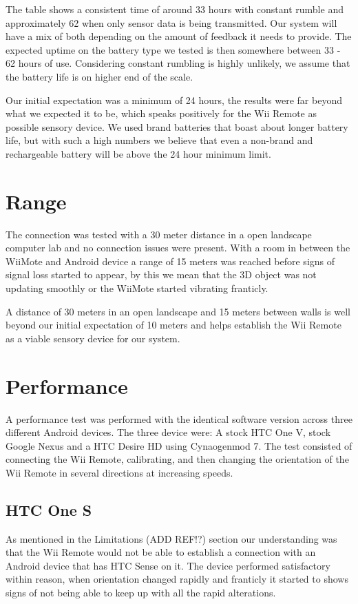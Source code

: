 The table shows a consistent time of around 33 hours with constant rumble and approximately 62 when only sensor data is being transmitted. Our system will have a mix of both depending on the amount of feedback it needs to provide. The expected uptime on the battery type we tested is then somewhere between 33 - 62 hours of use. Considering constant rumbling is highly unlikely, we assume that the battery life is on higher end of the scale.

Our initial expectation was a minimum of 24 hours, the results were far beyond what we expected it to be, which speaks positively for the Wii Remote as possible sensory device. We used brand batteries that boast about longer battery life, but with such a high numbers we believe that even a non-brand and rechargeable battery will be above the 24 hour minimum limit.
\section{Range}
The connection was tested with a 30 meter distance in a open landscape computer lab and no connection issues were present. With a room in between the WiiMote and Android device a range of 15 meters was reached before signs of signal loss started to appear, by this we mean that the 3D object was not updating smoothly or the WiiMote started vibrating franticly.

A distance of 30 meters in an open landscape and 15 meters between walls is well beyond our initial expectation of 10 meters and helps establish the Wii Remote as a viable sensory device for our system.
\section{Performance}
A performance test was performed with the identical software version across three different Android devices. The three device were: A stock HTC One V, stock Google Nexus and a HTC Desire HD using Cynaogenmod 7. The test consisted of connecting the Wii Remote, calibrating, and then changing the orientation of the Wii Remote in several directions at increasing speeds.

\subsection{HTC One S}
As mentioned in the Limitations (ADD REF!?) section our understanding was that the Wii Remote would not be able to establish a connection with an Android device that has HTC Sense on it. The device performed satisfactory within reason, when orientation changed rapidly and franticly it started to shows signs of not being able to keep up with all the rapid alterations.

